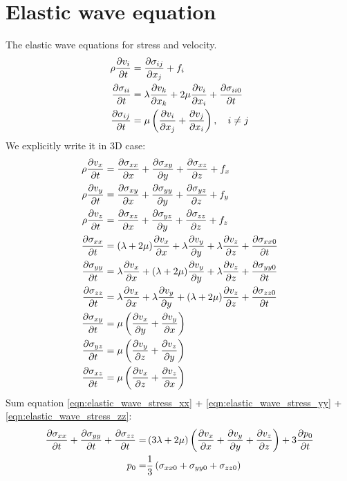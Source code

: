 \documentclass[pdftex,a4paper,parskip,listof=totoc,bibliography=totoc,onehalfspacing,12pt]{scrreprt}
\begin{document}
\section{Elastic wave equation}
\label{sec:elastic}
The elastic wave equations for stress and velocity.
\begin{align}
\label{eqn:elastic_wave_stress_xx}
\rho\pdv{v_i}{t}&=\pdv{\sigma_{ij}}{x_j}+ f_i\\
\pdv{\sigma_{ii}}{t} &= \lambda \pdv{v_k}{x_k} + 2\mu \pdv{v_i}{x_i}+\pdv{\sigma_{ii0}}{t}\\
\pdv{\sigma_{ij}}{t} &= \mu \left(\pdv{v_i}{x_j} +\pdv{v_j}{x_i}\right), \quad i \neq j
\end{align}
We explicitly write it in 3D case:
\begin{align}
\rho\pdv{v_x}{t}&=\pdv{\sigma_{xx}}{x}+\pdv{\sigma_{xy}}{y} + \pdv{\sigma_{xz}}{z}+ f_x\\
\rho\pdv{v_y}{t}&=\pdv{\sigma_{xy}}{x}+\pdv{\sigma_{yy}}{y} + \pdv{\sigma_{yz}}{z} + f_y\\
\rho\pdv{v_z}{t}&=\pdv{\sigma_{xz}}{x}+\pdv{\sigma_{yz}}{y} + \pdv{\sigma_{zz}}{z} + f_z\\ 
\label{eqn:elastic_wave_stress_xx}
\pdv{\sigma_{xx}}{t} &= (\lambda+2\mu) \pdv{v_x}{x} + \lambda \pdv{v_y}{y} + \lambda \pdv{v_z}{z} + \pdv{\sigma_{xx0}}{t}\\
\label{eqn:elastic_wave_stress_yy}
\pdv{\sigma_{yy}}{t} &= \lambda \pdv{v_x}{x} + (\lambda+2\mu) \pdv{v_y}{y} + \lambda \pdv{v_z}{z} + \pdv{\sigma_{yy0}}{t}\\ 
\label{eqn:elastic_wave_stress_zz}
\pdv{\sigma_{zz}}{t} &= \lambda \pdv{v_x}{x} +  \lambda \pdv{v_y}{y} + (\lambda+2\mu) \pdv{v_z}{z} + \pdv{\sigma_{zz0}}{t}\\
\pdv{\sigma_{xy}}{t} &= \mu \left(\pdv{v_x}{y} +\pdv{v_y}{x}\right)\\
\pdv{\sigma_{yz}}{t} &= \mu \left(\pdv{v_y}{z} +\pdv{v_z}{y}\right) \\
\pdv{\sigma_{xz}}{t} &= \mu \left(\pdv{v_x}{z} +\pdv{v_z}{x}\right)
\end{align}
Sum equation \ref{eqn:elastic_wave_stress_xx} + \ref{eqn:elastic_wave_stress_yy} + \ref{eqn:elastic_wave_stress_zz}:
\begin{equation}
\begin{align}
 \pdv{\sigma_{xx}}{t}+\pdv{\sigma_{yy}}{t}+\pdv{\sigma_{zz}}{t} =& \left(3\lambda+2\mu\right)\left(\pdv{v_x}{x}+\pdv{v_y}{y}+ \pdv{v_z}{z}\right) + 3 \pdv{p_0}{t}\\ 
 p_0 =& \frac{1}{3} \left( \sigma_{xx0}+\sigma_{yy0}+\sigma_{zz0} \right)
\end{align}
\end{equation}
\end{document}
